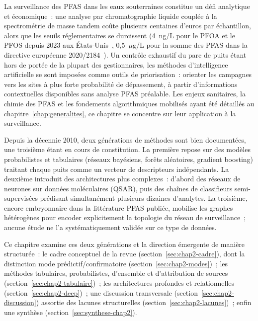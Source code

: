 \label{chap:etat-art}

\label{sec:intro-chap2}

La surveillance des PFAS dans les eaux souterraines constitue un d\'efi analytique et \'economique~: une analyse par chromatographie liquide coupl\'ee \`a la spectrom\'etrie de masse tandem co\^ute plusieurs centaines d'euros par \'echantillon, alors que les seuils r\'eglementaires se durcissent (4~ng/L pour le PFOA et le PFOS depuis 2023 aux \'Etats-Unis~\cite{epa2023npdwr}, 0,5~$\mu$g/L pour la somme des PFAS dans la directive europ\'eenne 2020/2184~\cite{eu2020drinkingwater}).
Un contr\^ole exhaustif du parc de puits \'etant hors de port\'ee de la plupart des gestionnaires, les m\'ethodes d'intelligence artificielle se sont impos\'ees comme outils de priorisation~: orienter les campagnes vers les sites \`a plus forte probabilit\'e de d\'epassement, \`a partir d'informations contextuelles disponibles sans analyse PFAS pr\'ealable.
Les enjeux sanitaires, la chimie des PFAS et les fondements algorithmiques mobilis\'es ayant \'et\'e d\'etaill\'es au chapitre~\ref{chap:generalites}, ce chapitre se concentre sur leur application \`a la surveillance.

Depuis la d\'ecennie 2010, deux g\'en\'erations de m\'ethodes sont bien document\'ees, une troisi\`eme \'etant en cours de constitution.
La premi\`ere repose sur des mod\`eles probabilistes et tabulaires (r\'eseaux bay\'esiens, for\^ets al\'eatoires, gradient boosting) traitant chaque puits comme un vecteur de descripteurs ind\'ependants.
La deuxi\`eme introduit des architectures plus complexes~: d'abord des r\'eseaux de neurones sur donn\'ees mol\'eculaires (QSAR), puis des cha\^ines de classifieurs semi-supervis\'ees pr\'edisant simultan\'ement plusieurs dizaines d'analytes.
La troisi\`eme, encore embryonnaire dans la litt\'erature PFAS publi\'ee, mobilise les graphes h\'et\'erog\`enes pour encoder explicitement la topologie du r\'eseau de surveillance~; aucune \'etude ne l'a syst\'ematiquement valid\'ee sur ce type de donn\'ees.

Ce chapitre examine ces deux g\'en\'erations et la direction \'emergente de mani\`ere structur\'ee~: le cadre conceptuel de la revue (section~\ref{sec:chap2-cadre}), dont la distinction mode pr\'edictif/confirmatoire (section~\ref{sec:chap2-modes})~; les m\'ethodes tabulaires, probabilistes, d'ensemble et d'attribution de sources (section~\ref{sec:chap2-tabulaire})~; les architectures profondes et relationnelles (section~\ref{sec:chap2-deep})~; une discussion transversale (section~\ref{sec:chap2-discussion}) assortie des lacunes structurelles (section~\ref{sec:chap2-lacunes})~; enfin une synth\`ese (section~\ref{sec:synthese-chap2}).



